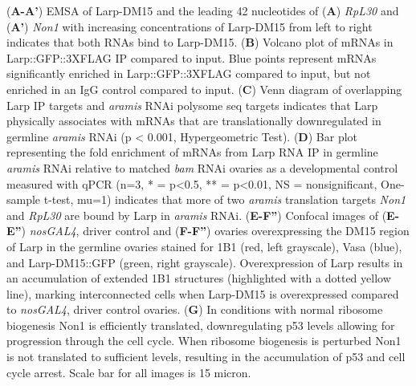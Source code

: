 \documentclass[12pt,oneside]{reedthesis}
\begin{document}
\textbf{\hfill\break
}

(\textbf{A-A'}) EMSA of Larp-DM15 and the leading 42 nucleotides of
(\textbf{A}) \emph{RpL30} and (\textbf{A'}) \emph{Non1} with increasing concentrations of
Larp-DM15 from left to right indicates that both RNAs bind to Larp-DM15.
(\textbf{B}) Volcano plot of mRNAs in Larp::GFP::3XFLAG IP compared to input.
Blue points represent mRNAs significantly enriched in Larp::GFP::3XFLAG
compared to input, but not enriched in an IgG control compared to input.
(\textbf{C}) Venn diagram of overlapping Larp IP targets and \emph{aramis} RNAi
polysome seq targets indicates that Larp physically associates with
mRNAs that are translationally downregulated in germline \emph{aramis} RNAi
(p \textless{} 0.001, Hypergeometric Test). (\textbf{D}) Bar plot representing the
fold enrichment of mRNAs from Larp RNA IP in germline \emph{aramis} RNAi
relative to matched \emph{bam} RNAi ovaries as a developmental control
measured with qPCR (n=3, * = p\textless0.5, ** = p\textless0.01, NS =
nonsignificant, One-sample t-test, mu=1) indicates that more of two
\emph{aramis} translation targets \emph{Non1} and \emph{RpL30} are bound by Larp in
\emph{aramis} RNAi. (\textbf{E-F''}) Confocal images of (\textbf{E-E''}) \emph{nosGAL4},
driver control and (\textbf{F-F''}) ovaries overexpressing the DM15 region of
Larp in the germline ovaries stained for 1B1 (red, left grayscale), Vasa
(blue), and Larp-DM15::GFP (green, right grayscale). Overexpression of
Larp results in an accumulation of extended 1B1 structures (highlighted
with a dotted yellow line), marking interconnected cells when Larp-DM15
is overexpressed compared to \emph{nosGAL4}, driver control ovaries. (\textbf{G})
In conditions with normal ribosome biogenesis Non1 is efficiently
translated, downregulating p53 levels allowing for progression through
the cell cycle. When ribosome biogenesis is perturbed Non1 is not
translated to sufficient levels, resulting in the accumulation of p53
and cell cycle arrest. Scale bar for all images is 15 micron.

\textbf{\hfill\break
}
\end{document}

